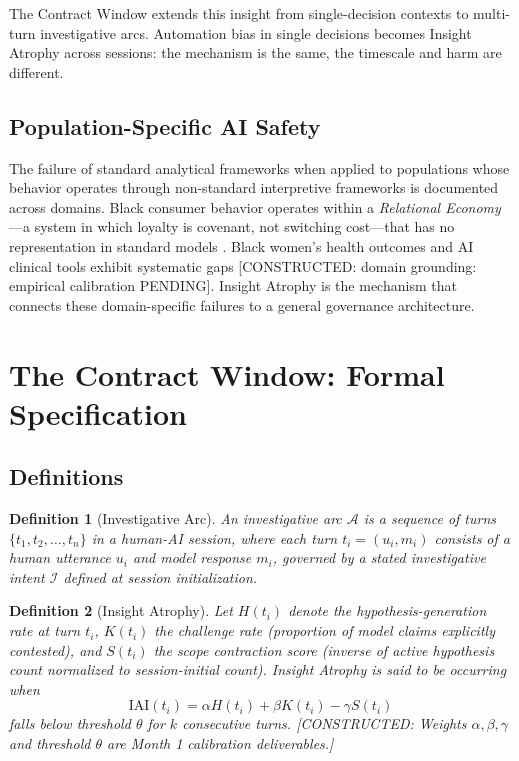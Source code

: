 \documentclass{article}
\newtheorem{definition}{Definition}
\newcommand{\ia}{Insight Atrophy\xspace}
\newcommand{\constructed}[1]{\textcolor{pendingred}{[CONSTRUCTED: #1]}}
\begin{document}
The Contract Window extends this insight from single-decision contexts to
multi-turn investigative arcs. Automation bias in single decisions
\citep{dietvorst2015algorithm} becomes Insight Atrophy across sessions: the
mechanism is the same, the timescale and harm are different.

\subsection{Population-Specific AI Safety}

The failure of standard analytical frameworks when applied to populations
whose behavior operates through non-standard interpretive frameworks is
documented across domains. Black consumer behavior operates within a
\emph{Relational Economy}---a system in which loyalty is covenant, not
switching cost---that has no representation in standard models
\citep{alejandro2026frontin}. Black women's health outcomes and AI clinical
tools exhibit systematic gaps \constructed{domain grounding: empirical
calibration PENDING}. Insight Atrophy is the mechanism that connects these
domain-specific failures to a general governance architecture.

\section{The Contract Window: Formal Specification}
\label{sec:cw}

\subsection{Definitions}

\begin{definition}[Investigative Arc]
An investigative arc $\mathcal{A}$ is a sequence of turns
$\{t_1, t_2, \ldots, t_n\}$ in a human-AI session, where each turn
$t_i = (u_i, m_i)$ consists of a human utterance $u_i$ and model response
$m_i$, governed by a stated investigative intent $\mathcal{I}$ defined at
session initialization.
\end{definition}

\begin{definition}[\ia]
Let $H(t_i)$ denote the hypothesis-generation rate at turn $t_i$,
$K(t_i)$ the challenge rate (proportion of model claims explicitly contested),
and $S(t_i)$ the scope contraction score (inverse of active hypothesis count
normalized to session-initial count). Insight Atrophy is said to be occurring
when
\begin{equation}
\text{IAI}(t_i) = \alpha H(t_i) + \beta K(t_i) - \gamma S(t_i)
\label{eq:iai}
\end{equation}
falls below threshold $\theta$ for $k$ consecutive turns.
\constructed{Weights $\alpha, \beta, \gamma$ and threshold $\theta$ are Month 1
calibration deliverables.}
\end{definition}
\end{document}
